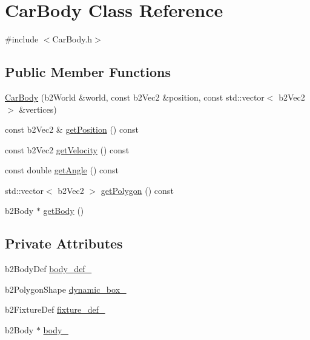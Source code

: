 \hypertarget{classCarBody}{}\section{Car\+Body Class Reference}
\label{classCarBody}


{\ttfamily \#include $<$Car\+Body.\+h$>$}

\subsection*{Public Member Functions}
\begin{DoxyCompactItemize}
\item 
\hyperlink{classCarBody_a060cf8a8c5d2313c331de3dbe8ea93e9}{Car\+Body} (b2\+World \&world, const b2\+Vec2 \&position, const std\+::vector$<$ b2\+Vec2 $>$ \&vertices)
\item 
const b2\+Vec2 \& \hyperlink{classCarBody_aa58f688a6f2ae687870daa41b73db625}{get\+Position} () const
\item 
const b2\+Vec2 \hyperlink{classCarBody_aac28c2ac7e21b88ebc85f9999bac9b3d}{get\+Velocity} () const
\item 
const double \hyperlink{classCarBody_a92d8865abe51f98b4fa7b4314e7372d8}{get\+Angle} () const
\item 
std\+::vector$<$ b2\+Vec2 $>$ \hyperlink{classCarBody_ad446bb563f4475c59d28054bbe886a9d}{get\+Polygon} () const
\item 
b2\+Body $\ast$ \hyperlink{classCarBody_abf98252ba6d666ce771acfdf7c6d66cb}{get\+Body} ()
\end{DoxyCompactItemize}
\subsection*{Private Attributes}
\begin{DoxyCompactItemize}
\item 
b2\+Body\+Def \hyperlink{classCarBody_a304e0ab7625f9673e4f25c7c52cfd3f8}{body\+\_\+def\+\_\+}
\item 
b2\+Polygon\+Shape \hyperlink{classCarBody_aff94f91206a0bdfa00257e68bfcc5633}{dynamic\+\_\+box\+\_\+}
\item 
b2\+Fixture\+Def \hyperlink{classCarBody_abd8188a5a14a45854cc80da8a70d1c12}{fixture\+\_\+def\+\_\+}
\item 
b2\+Body $\ast$ \hyperlink{classCarBody_aa460930fa1548d1987051dfa6f68c897}{body\+\_\+}
\end{DoxyCompactItemize}
